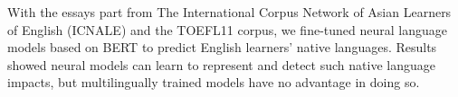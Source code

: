 With the essays part from The International Corpus Network of Asian Learners of English (ICNALE) and the TOEFL11 corpus, we fine-tuned neural language models based on BERT to predict English learners' native languages. Results showed neural models can learn to represent and detect such native language impacts, but multilingually trained models have no advantage in doing so.

